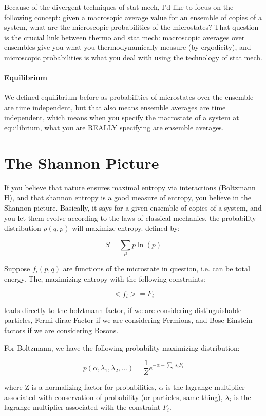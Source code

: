 \documentclass[12pt]{article}
\begin{document}
Because of the divergent techniques of stat mech, I'd like to focus on the following concept:  given a macrosopic average value for an ensemble of copies of a system, what are the microscopic probabilities of the microstates?  That question is the crucial link between thermo and stat mech: macroscopic averages over ensembles give you what you thermodynamically measure (by ergodicity), and microscopic probabilities is what you deal with using the technology of stat mech.

\paragraph{Equilibrium}

We defined equilibrium before as probabilities of microstates over the ensemble are time independent, but that also means ensemble averages are time independent, which means when you specify the macrostate of a system at equilibrium, what you are REALLY specifying are ensemble averages.

\section{The Shannon Picture}

If you believe that nature ensures maximal entropy via interactions (Boltzmann H), and that shannon entropy is a good measure of entropy, you believe in the Shannon picture.  Basically, it says for a given ensemble of copies of a system, and you let them evolve according to the laws of classical mechanics, the probability distribution $\rho(q,p)$ will maximize entropy. defined by:


$$ S = \sum_{\mu} p \ln(p)$$

Suppose $f_i(p,q)$ are functions of the microstate in question, i.e. can be total energy.  The, maximizing entropy with the following constraints:

$$<f_i>= F_i$$

leads directly to the bolztmann factor, if we are considering distinguishable particles, Fermi-dirac Factor if we are considering Fermions, and Bose-Einstein factors if we are considering Bosons.

For Boltzmann, we have the following probability maximizing distribution:

$$p(\alpha, \lambda_1, \lambda_2,...) = \frac{1}{Z} e^{- \alpha - \sum_i \lambda_i F_i}$$

where Z is a normalizing factor for probabilities, $\alpha$ is the lagrange multiplier associated with conservation of probability (or particles, same thing), $\lambda_i$ is the lagrange multiplier associated with the constraint $F_i$.
\end{document}
